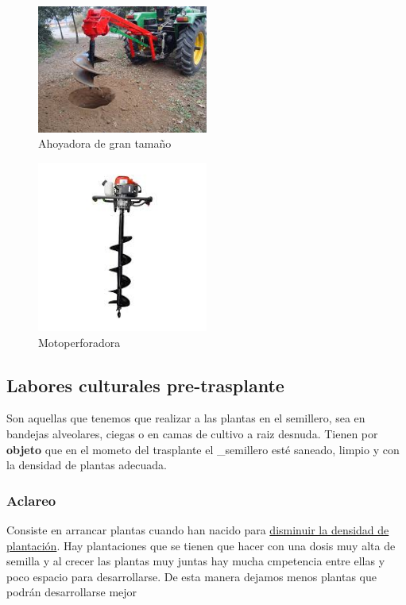 \documentclass[a4paper,12pt,oneside]{article}
\begin{document}
\begin{enumerate}
\begin{center}
\begin{figure}[htbp]
\centering
\includegraphics[width=0.5\textwidth]{./img_uf1596/perf_tractor.jpg}
\caption{\label{fig:org16111c9}
Ahoyadora de gran tamaño}
\end{figure}

\begin{figure}[htbp]
\centering
\includegraphics[width=0.5\textwidth]{./img_uf1596/motoperforadora.jpg}
\caption{\label{fig:org211519b}
Motoperforadora}
\end{figure}
\end{center}
\end{enumerate}

\subsection{Labores culturales pre-trasplante}
\label{sec:orgb3f1286}

Son aquellas que tenemos que realizar a las plantas en el semillero, sea en
bandejas alveolares, ciegas o en camas de cultivo a raiz desnuda. Tienen por
\textbf{objeto} que en el mometo del trasplante el \_semillero esté saneado, limpio y
con la densidad de plantas adecuada.  

\subsubsection{Aclareo}
\label{sec:org5298f3b}
Consiste en arrancar plantas cuando han nacido para \uline{disminuir la densidad de 
plantación}. Hay plantaciones que se tienen que hacer con una dosis muy alta de
semilla y al crecer las plantas muy juntas hay mucha cmpetencia entre ellas y
poco espacio para desarrollarse. De esta manera dejamos menos plantas que podrán
desarrollarse mejor
\end{document}
